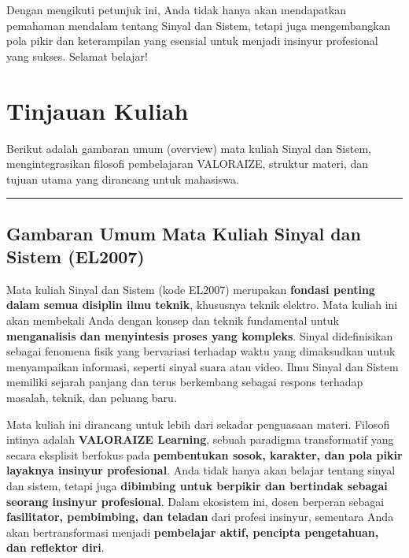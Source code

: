 \documentclass[
  letterpaper,
  DIV=11,
  numbers=noendperiod]{scrreprt}
\begin{document}
Dengan mengikuti petunjuk ini, Anda tidak hanya akan mendapatkan
pemahaman mendalam tentang Sinyal dan Sistem, tetapi juga mengembangkan
pola pikir dan keterampilan yang esensial untuk menjadi insinyur
profesional yang sukses. Selamat belajar!


\chapter*{Tinjauan Kuliah}\label{tinjauan-kuliah}


Berikut adalah gambaran umum (overview) mata kuliah Sinyal dan Sistem,
mengintegrasikan filosofi pembelajaran VALORAIZE, struktur materi, dan
tujuan utama yang dirancang untuk mahasiswa.

\begin{center}\rule{0.5\linewidth}{0.5pt}\end{center}

\section*{\texorpdfstring{\textbf{Gambaran Umum Mata Kuliah Sinyal dan
Sistem
(EL2007)}}{Gambaran Umum Mata Kuliah Sinyal dan Sistem (EL2007)}}\label{gambaran-umum-mata-kuliah-sinyal-dan-sistem-el2007}


Mata kuliah Sinyal dan Sistem (kode EL2007) merupakan \textbf{fondasi
penting dalam semua disiplin ilmu teknik}, khususnya teknik elektro.
Mata kuliah ini akan membekali Anda dengan konsep dan teknik fundamental
untuk \textbf{menganalisis dan menyintesis proses yang kompleks}. Sinyal
didefinisikan sebagai fenomena fisik yang bervariasi terhadap waktu yang
dimaksudkan untuk menyampaikan informasi, seperti sinyal suara atau
video. Ilmu Sinyal dan Sistem memiliki sejarah panjang dan terus
berkembang sebagai respons terhadap masalah, teknik, dan peluang baru.

Mata kuliah ini dirancang untuk lebih dari sekadar penguasaan materi.
Filosofi intinya adalah \textbf{VALORAIZE Learning}, sebuah paradigma
transformatif yang secara eksplisit berfokus pada \textbf{pembentukan
sosok, karakter, dan pola pikir layaknya insinyur profesional}. Anda
tidak hanya akan belajar tentang sinyal dan sistem, tetapi juga
\textbf{dibimbing untuk berpikir dan bertindak sebagai seorang insinyur
profesional}. Dalam ekosistem ini, dosen berperan sebagai
\textbf{fasilitator, pembimbing, dan teladan} dari profesi insinyur,
sementara Anda akan bertransformasi menjadi \textbf{pembelajar aktif,
pencipta pengetahuan, dan reflektor diri}.
\end{document}
